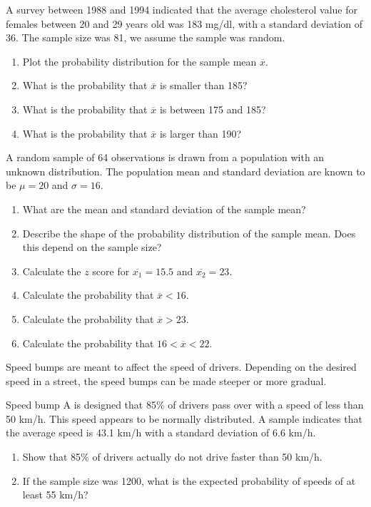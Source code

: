 \begin{exercise}
  A survey between 1988 and 1994 indicated that the average cholesterol value for females between 20 and 29 years old was 183 mg/dl, with a standard deviation of 36. The sample size was 81, we assume the sample was random.
  
  \begin{enumerate}[label=\alph*.]
    \item Plot the probability distribution for the sample mean $\overline{x}$.
    \item What is the probability that $\overline{x}$ is smaller than 185?
    \item What is the probability that $\overline{x}$ is between 175 and 185?
    \item What is the probability that $\overline{x}$ is larger than 190? 
  \end{enumerate}
\end{exercise}

\begin{exercise}
  A random sample of 64 observations is drawn from a population with an unknown distribution. The population mean and standard deviation are known to be $\mu = 20$ and $\sigma=16$.
  
  \begin{enumerate}[label=\alph*.]
    \item What are the mean and standard deviation of the sample mean?
    \item Describe the shape of the probability distribution of the sample mean. Does this depend on the sample size?
    \item Calculate the $z$ score for $\overline{x_{1}} = 15.5$ and $\overline{x_{2}} = 23$.
    \item Calculate the probability that $\overline{x} <16$.
    \item Calculate the probability that $\overline{x} > 23$.
    \item Calculate the probability that $16< \overline{x}< 22$.
  \end{enumerate}
\end{exercise}

\begin{exercise}
  Speed bumps are meant to affect the speed of drivers. Depending on the desired speed in a street, the speed bumps can be made steeper or more gradual.
  
  Speed bump A is designed that 85\% of drivers pass over with a speed of less than 50 km/h. This speed appears to be normally distributed. A sample indicates that the average speed is 43.1 km/h with a standard deviation of 6.6 km/h.
  
  \begin{enumerate}[label=\alph*.]
    \item Show that 85\% of drivers actually do not drive faster than 50 km/h.
    \item If the sample size was 1200, what is the expected probability of speeds of at least 55 km/h?
  \end{enumerate}
\end{exercise}

